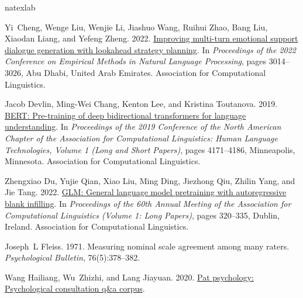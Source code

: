 \documentclass[11pt]{article}
\begin{document}
%
%

\begin{thebibliography}{20}
\expandafter\ifx\csname natexlab\endcsname\relax\def\natexlab#1{#1}\fi

Yi~Cheng, Wenge Liu, Wenjie Li, Jiashuo Wang, Ruihui Zhao, Bang Liu, Xiaodan Liang, and Yefeng Zheng. 2022.
\newblock \href {https://aclanthology.org/2022.emnlp-main.195} {Improving multi-turn emotional support dialogue generation with lookahead strategy planning}.
\newblock In \emph{Proceedings of the 2022 Conference on Empirical Methods in Natural Language Processing}, pages 3014--3026, Abu Dhabi, United Arab Emirates. Association for Computational Linguistics.

Jacob Devlin, Ming-Wei Chang, Kenton Lee, and Kristina Toutanova. 2019.
\newblock \href {https://doi.org/10.18653/v1/N19-1423} {{BERT}: Pre-training of deep bidirectional transformers for language understanding}.
\newblock In \emph{Proceedings of the 2019 Conference of the North {A}merican Chapter of the Association for Computational Linguistics: Human Language Technologies, Volume 1 (Long and Short Papers)}, pages 4171--4186, Minneapolis, Minnesota. Association for Computational Linguistics.

Zhengxiao Du, Yujie Qian, Xiao Liu, Ming Ding, Jiezhong Qiu, Zhilin Yang, and Jie Tang. 2022.
\newblock \href {https://doi.org/10.18653/v1/2022.acl-long.26} {{GLM}: General language model pretraining with autoregressive blank infilling}.
\newblock In \emph{Proceedings of the 60th Annual Meeting of the Association for Computational Linguistics (Volume 1: Long Papers)}, pages 320--335, Dublin, Ireland. Association for Computational Linguistics.

Joseph~L Fleiss. 1971.
\newblock Measuring nominal scale agreement among many raters.
\newblock \emph{Psychological Bulletin}, 76(5):378--382.

Wang Hailiang, Wu~Zhizhi, and Lang Jiayuan. 2020.
\newblock \href {https://github.com/chatopera/efaqa-corpus-zh} {Pat psychology: Psychological consultation q\&a corpus}.


\end{thebibliography}
\end{document}
